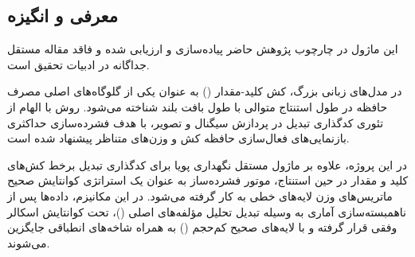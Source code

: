 \subsection{معرفی و انگیزه}
این ماژول در چارچوب پژوهش حاضر پیاده‌سازی و ارزیابی شده و فاقد مقاله مستقل جداگانه در ادبیات تحقیق است.

در مدل‌های زبانی بزرگ، کش کلید-مقدار () به عنوان یکی از گلوگاه‌های اصلی مصرف حافظه در طول استنتاج متوالی با طول بافت بلند شناخته می‌شود. روش  با الهام از تئوری کدگذاری تبدیل در پردازش سیگنال و تصویر، با هدف فشرده‌سازی حداکثری بازنمایی‌های فعال‌سازی حافظه کش و وزن‌های متناظر پیشنهاد شده است.

در این پروژه، علاوه بر ماژول مستقل نگهداری پویا  برای کدگذاری تبدیل برخط کش‌های کلید و مقدار در حین استنتاج، موتور فشرده‌ساز  به عنوان یک استراتژی کوانتایش صحیح ماتریس‌های وزن لایه‌های خطی به کار گرفته می‌شود. در این مکانیزم، داده‌ها پس از ناهمبسته‌سازی آماری به وسیله تبدیل تحلیل مؤلفه‌های اصلی ()، تحت کوانتایش اسکالر وفقی قرار گرفته و با لایه‌های صحیح کم‌حجم () به همراه شاخه‌های انطباقی  جایگزین می‌شوند.
